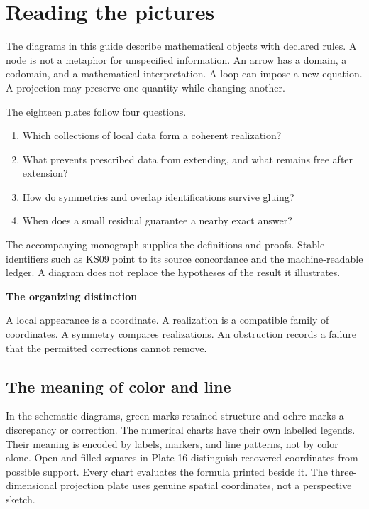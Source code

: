 \documentclass[11pt]{article}
\begin{document}
\KomorebiCover
\section*{Reading the pictures}
The diagrams in this guide describe mathematical objects with declared rules. A node is not a metaphor for unspecified information. An arrow has a domain, a codomain, and a mathematical interpretation. A loop can impose a new equation. A projection may preserve one quantity while changing another.

The eighteen plates follow four questions.
\begin{enumerate}
\item Which collections of local data form a coherent realization?
\item What prevents prescribed data from extending, and what remains free after extension?
\item How do symmetries and overlap identifications survive gluing?
\item When does a small residual guarantee a nearby exact answer?
\end{enumerate}

The accompanying monograph supplies the definitions and proofs. Stable identifiers such as KS09 point to its source concordance and the machine-readable ledger. A diagram does not replace the hypotheses of the result it illustrates.

\begin{insight}
\textbf{The organizing distinction}\par
A local appearance is a coordinate. A realization is a compatible family of coordinates. A symmetry compares realizations. An obstruction records a failure that the permitted corrections cannot remove.
\end{insight}

\subsection*{The meaning of color and line}
In the schematic diagrams, green marks retained structure and ochre marks a discrepancy or correction. The numerical charts have their own labelled legends. Their meaning is encoded by labels, markers, and line patterns, not by color alone. Open and filled squares in Plate 16 distinguish recovered coordinates from possible support. Every chart evaluates the formula printed beside it. The three-dimensional projection plate uses genuine spatial coordinates, not a perspective sketch.
\end{document}
